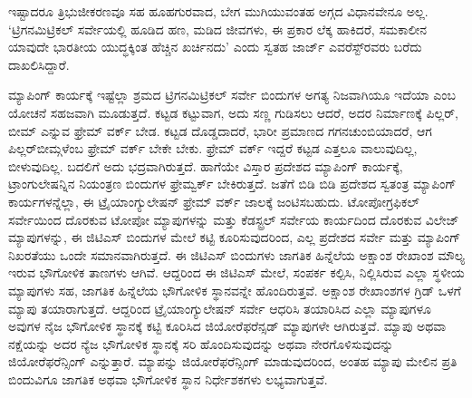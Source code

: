 ಇಷ್ಟಾದರೂ ತ್ರಿಭುಜೀಕರಣವೂ ಸಹ ಹೂಹಗುರವಾದ, ಬೇಗ ಮುಗಿಯುವಂತಹ ಅಗ್ಗದ ವಿಧಾನವೇನೂ ಅಲ್ಲ. ‘ಟ್ರಿಗನಮಿಟ್ರಿಕಲ್​ ಸರ್ವೇಯಲ್ಲಿ ಹೂಡಿದ ಹಣ, ಮಡಿದ ಜೀವಗಳು, ಈ ಪ್ರಕಾರ ಲೆಕ್ಕ ಹಾಕಿದರೆ, ಸಮಕಾಲೀನ ಯಾವುದೇ ಭಾರತೀಯ ಯುದ್ಧಕ್ಕಿಂತ ಹೆಚ್ಚಿನ ಖರ್ಚಿನದು’ ಎಂದು ಸ್ವತಹ ಜಾರ್ಜ್ ಎವರೆಸ್ಟ್​ರವರು ಬರೆದು ದಾಖಲಿಸಿದ್ದಾರೆ.

ಮ್ಯಾಪಿಂಗ್​ ಕಾರ್ಯಕ್ಕೆ ಇಷ್ಟೆಲ್ಲಾ ಶ್ರಮದ ಟ್ರಿಗನಮಿಟ್ರಿಕಲ್​ ಸರ್ವೇ ಬಿಂದುಗಳ ಅಗತ್ಯ ನಿಜವಾಗಿಯೂ ಇದೆಯಾ ಎಂಬ ಯೋಚನೆ ಸಹಜವಾಗಿ ಮೂಡುತ್ತದೆ. ಕಟ್ಟಡ ಕಟ್ಟುವಾಗ, ಅದು ಸಣ್ಣ ಗುಡಿಸಲು ಆದರೆ, ಅದರ ನಿರ್ಮಾಣಕ್ಕೆ ಪಿಲ್ಲರ್​, ಬೀಮ್ ಎನ್ನುವ ಫ್ರೇಮ್ ವರ್ಕ್ ಬೇಡ. ಕಟ್ಟಡ ದೊಡ್ಡದಾದರೆ, ಭಾರೀ ಪ್ರಮಾಣದ ಗಗನಚುಂಬಿಯಾದರೆ, ಆಗ ಪಿಲ್ಲರ್​ ಬೀಮ್ಗಳೆಂಬ ಫ್ರೇಮ್ ವರ್ಕ್ ಬೇಕೇ ಬೇಕು. ಫ್ರೇಮ್ ವರ್ಕ್ ಇದ್ದರೆ ಕಟ್ಟಡ ಎತ್ತಲೂ ವಾಲುವುದಿಲ್ಲ, ಬೀಳುವುದಿಲ್ಲ. ಬದಲಿಗೆ ಅದು ಭದ್ರವಾಗಿರುತ್ತದೆ. ಹಾಗೆಯೇ ವಿಸ್ತಾರ ಪ್ರದೇಶದ ಮ್ಯಾಪಿಂಗ್​ ಕಾರ್ಯಕ್ಕೆ, ಟ್ರಾಂಗುಲೇಷನ್ನಿನ ನಿಯಂತ್ರಣ ಬಿಂದುಗಳ ಫ್ರೇಮ್ವರ್ಕ್ ಬೇಕಿರುತ್ತದೆ. ಜತೆಗೆ ಬಿಡಿ ಬಿಡಿ ಪ್ರದೇಶದ ಸ್ವತಂತ್ರ ಮ್ಯಾಪಿಂಗ್​ ಕಾರ್ಯಗಳನ್ನೆಲ್ಲಾ, ಈ ಟ್ರೈಯಾಂಗ್ಯುಲೇಷನ್​ ಫ್ರೇಮ್ ವರ್ಕ್ ಜಾಲಕ್ಕೆ ಜಂಟಿಸಬಹುದು. ಟೋಪೋಗ್ರಫಿಕಲ್​ ಸರ್ವೇಯಿಂದ ದೊರಕುವ ಟೋಪೋ ಮ್ಯಾಪುಗಳನ್ನು ಮತ್ತು ಕೆಡಸ್ಟ್ರಲ್​ ಸರ್ವೇಯ ಕಾರ್ಯದಿಂದ ದೊರಕುವ ವಿಲೇಜ್​ ಮ್ಯಾಪುಗಳನ್ನು, ಈ ಜಿಟಿಎಸ್​ ಬಿಂದುಗಳ ಮೇಲೆ ಕಟ್ಟಿ ಕೂರಿಸುವುದರಿಂದ, ಎಲ್ಲ ಪ್ರದೇಶದ ಸರ್ವೇ ಮತ್ತು ಮ್ಯಾಪಿಂಗ್​ ನಿಖರತೆಯು ಒಂದೇ ಸಮಾನವಾಗಿರುತ್ತದೆ. ಈ ಜಿಟಿಎಸ್​ ಬಿಂದುಗಳು ಜಾಗತಿಕ ಹಿನ್ನೆಲೆಯ ಅಕ್ಷಾಂಶ ರೇಖಾಂಶ ಮೌಲ್ಯ ಇರುವ ಭೌಗೋಳಿಕ ತಾಣಗಳು ಆಗಿವೆ. ಆದ್ದರಿಂದ ಈ ಜಿಟಿಎಸ್​ ಮೇಲೆ, ಸಂಪರ್ಕ ಕಲ್ಪಿಸಿ, ನಿಲ್ಲಿಸಿರುವ ಎಲ್ಲಾ ಸ್ಥಳೀಯ ಮ್ಯಾಪುಗಳು ಸಹ, ಜಾಗತಿಕ ಹಿನ್ನೆಲೆಯ ಭೌಗೋಳಿಕ ಸ್ಥಾನವನ್ನೇ ಹೊಂದಿರುತ್ತವೆ. ಅಕ್ಷಾಂಶ ರೇಖಾಂಶಗಳ ಗ್ರಿಡ್​ ಒಳಗೆ ಮ್ಯಾಪು ತಯಾರಾಗುತ್ತದೆ. ಆದ್ದರಿಂದ ಟ್ರೈಯಾಂಗ್ಯುಲೇಷನ್​ ಸರ್ವೇ ಆಧರಿಸಿ ತಯಾರಿಸಿದ ಎಲ್ಲಾ ಮ್ಯಾಪುಗಳೂ ಅವುಗಳ ನೈಜ ಭೌಗೋಳಿಕ ಸ್ಥಾನಕ್ಕೆ ಕಟ್ಟಿ ಕೂರಿಸಿದ ಜಿಯೋರೆಫರೆನ್ಸಡ್​ ಮ್ಯಾಪುಗಳೇ ಆಗಿರುತ್ತವೆ. ಮ್ಯಾಪು ಅಥವಾ ನಕ್ಷೆಯನ್ನು ಅದರ ನ್ಯೆಜ ಭೌಗೋಳಿಕ ಸ್ಥಾನಕ್ಕೆ ಸರಿ ಹೊಂದಿಸುವುದನ್ನು ಅಥವಾ ನೇರಗೊಳಿಸುವುದನ್ನು ಜಿಯೋರೆಫರೆನ್ಸಿಂಗ್​ ಎನ್ನುತ್ತಾರೆ. ಮ್ಯಾಪನ್ನು ಜಿಯೋರೆಫರೆನ್ಸಿಂಗ್​ ಮಾಡುವುದರಿಂದ, ಅಂತಹ ಮ್ಯಾಪು ಮೇಲಿನ ಪ್ರತಿ ಬಿಂದುವಿಗೂ ಜಾಗತಿಕ ಅಥವಾ ಭೌಗೋಳಿಕ ಸ್ಥಾನ ನಿರ್ಧೇಶಕಗಳು ಲಭ್ಯವಾಗುತ್ತವೆ.

